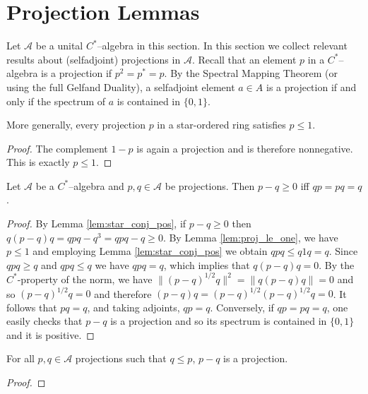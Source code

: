 \chapter{Projection Lemmas}

Let $\mathcal{A}$ be a unital $C^{*}$--algebra in this section. In this section we collect relevant results about (selfadjoint) projections in $\mathcal{A}$.
Recall that an element $p$ in a $C^{*}$--algebra is a projection if $p^2=p^{*}=p$. By the Spectral Mapping Theorem (or using the full Gelfand Duality),
a selfadjoint element $a\in A$ is a projection if and only if the spectrum of $a$ is contained in $\{0,1\}$.

\begin{lemma}
  \label{lem:proj_le_one}
  \mathlibok
  More generally, every projection $p$ in a star-ordered ring satisfies $p\le 1$.
\end{lemma}

\begin{proof}
  \leanok
  The complement $1-p$ is again a projection and is therefore nonnegative. This is exactly
  $p\le 1$.
\end{proof}

\begin{lemma}
  \label{lem:proj_sub_pos_iff_comm_eq_self}
  \leanok
  Let $\mathcal{A}$ be a $C^{*}$--algebra and $p,q \in \mathcal{A}$ be projections. Then $p-q\ge 0$ iff $qp = pq = q$.
\end{lemma}

\begin{proof}
  \leanok
  By Lemma \ref{lem:star_conj_pos}, if $p-q \ge 0$ then $q(p-q)q=qpq-q^3=qpq-q \ge 0$. By Lemma \ref{lem:proj_le_one}, we have $p\le 1$ and
  employing Lemma \ref{lem:star_conj_pos} we obtain $qpq\le q1q=q$. Since $qpq\ge q$ and $qpq\le q$ we have $qpq=q$, which implies that $q(p-q)q=0$.
  By the $C^{*}$-property of the norm, we have $\|(p-q)^{1/2}q\|^2=\|q(p-q)q\|=0$ and so $(p-q)^{1/2}q=0$ and therefore $(p-q)q=(p-q)^{1/2}(p-q)^{1/2}q=0$.
  It follows that $pq=q$, and taking adjoints, $qp=q$.
  Conversely, if $qp=pq=q$, one easily checks that $p-q$ is a projection and so its spectrum is contained in $\{0,1\}$ and it is positive.
\end{proof}

\begin{corollary}
  \label{cor:proj_sub_of_subproj}
  \leanok
  For all $p,q \in \mathcal{A}$ projections such that $q\le p$, $p-q$ is a projection.
\end{corollary}
\begin{proof}
  \leanok
\end{proof}

